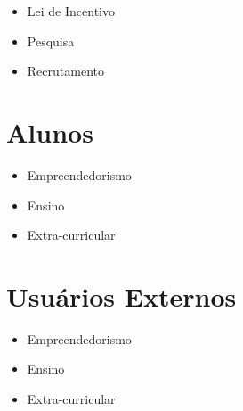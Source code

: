 \begin{itemize}
\item Lei de Incentivo
\item Pesquisa
\item Recrutamento
\end{itemize}

\section{Alunos}
\label{sec:con_alunos}

\begin{itemize}
\item Empreendedorismo
\item Ensino
\item Extra-curricular
\end{itemize}

\section{Usuários Externos}
\label{sec:con_usuarios}

\begin{itemize}
\item Empreendedorismo
\item Ensino
\item Extra-curricular
\end{itemize}